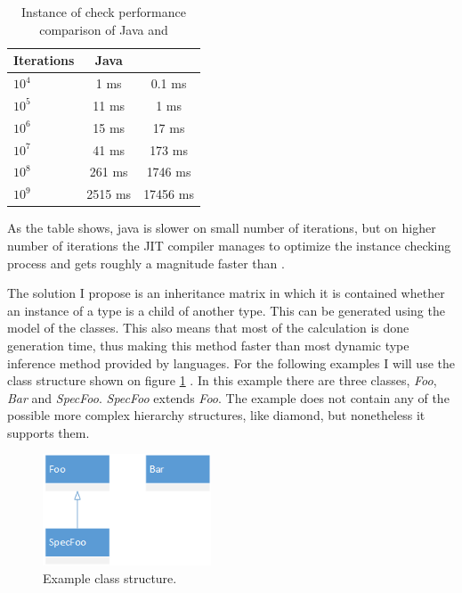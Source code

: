 \begin{table}[ht]
	\footnotesize
	\centering
	\caption{Instance of check performance comparison of Java and \CPP{}}\label{tab:InstPerf}
	\begin{tabular}{ | l | c | c |}
	\hline
	Iterations 	& Java 		& \CPP{} 		 \\ \hline
	$10^4$ 		&  1	ms 	& 0.1	ms \\
	$10^5$ 		&  11 	ms  & 1		ms \\
	$10^6$ 		&  15 	ms  & 17	ms \\
	$10^7$ 		&  41 	ms  & 173	ms \\
	$10^8$ 		&  261 	ms  & 1746	ms \\
	$10^9$ 		&  2515 ms  & 17456	ms \\
	\hline
	\end{tabular}
	\label{tab:TabularExample}
\end{table}

As the table shows, java is slower on small number of iterations, but on higher
number of iterations the JIT compiler manages to optimize the instance checking
process and gets roughly a magnitude faster than \CPP{}.

The solution I propose is an inheritance matrix in which it is contained whether
an instance of a type is a child of another type. This can be generated using
the model of the classes. This also means that most of the calculation is done
generation time, thus making this method faster than most dynamic type
inference method provided by languages. For the following examples I will use
the class structure shown on figure \ref{fig:simple_class} . In this example
there are three classes, \emph{Foo}, \emph{Bar} and \emph{SpecFoo}.
\emph{SpecFoo} extends \emph{Foo}. The example does not contain any of
the possible more complex hierarchy structures, like diamond, but nonetheless it
supports them.

\begin{figure}[!ht]
\centering
\includegraphics[width=50mm, keepaspectratio]{figures/simple_class.png}
\caption{Example class structure.}
\label{fig:simple_class}
\end{figure}

